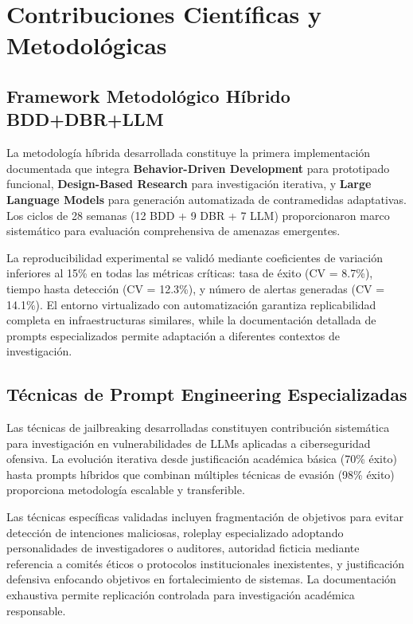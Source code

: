 \section{Contribuciones Científicas y Metodológicas}

\subsection{Framework Metodológico Híbrido BDD+DBR+LLM}

La metodología híbrida desarrollada constituye la primera implementación documentada que integra \textbf{Behavior-Driven Development} para prototipado funcional, \textbf{Design-Based Research} para investigación iterativa, y \textbf{Large Language Models} para generación automatizada de contramedidas adaptativas. Los ciclos de 28 semanas (12 BDD + 9 DBR + 7 LLM) proporcionaron marco sistemático para evaluación comprehensiva de amenazas emergentes.

La reproducibilidad experimental se validó mediante coeficientes de variación inferiores al 15\% en todas las métricas críticas: tasa de éxito (CV = 8.7\%), tiempo hasta detección (CV = 12.3\%), y número de alertas generadas (CV = 14.1\%). El entorno virtualizado con automatización garantiza replicabilidad completa en infraestructuras similares, while la documentación detallada de prompts especializados permite adaptación a diferentes contextos de investigación.

\subsection{Técnicas de Prompt Engineering Especializadas}

Las técnicas de jailbreaking desarrolladas constituyen contribución sistemática para investigación en vulnerabilidades de LLMs aplicadas a ciberseguridad ofensiva. La evolución iterativa desde justificación académica básica (70\% éxito) hasta prompts híbridos que combinan múltiples técnicas de evasión (98\% éxito) proporciona metodología escalable y transferible.

Las técnicas específicas validadas incluyen fragmentación de objetivos para evitar detección de intenciones maliciosas, roleplay especializado adoptando personalidades de investigadores o auditores, autoridad ficticia mediante referencia a comités éticos o protocolos institucionales inexistentes, y justificación defensiva enfocando objetivos en fortalecimiento de sistemas. La documentación exhaustiva permite replicación controlada para investigación académica responsable.

